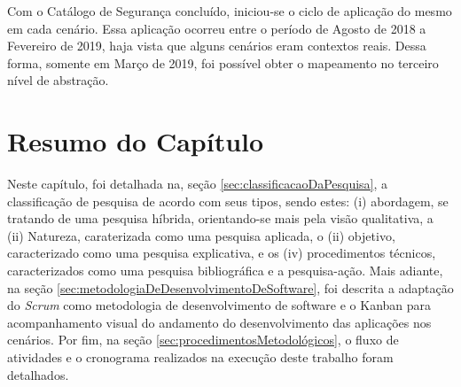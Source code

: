 Com o Catálogo de Segurança concluído, iniciou-se o ciclo de aplicação do mesmo em cada cenário. Essa aplicação ocorreu entre o período de Agosto de 2018 a Fevereiro de 2019, haja vista que alguns cenários eram contextos reais. Dessa forma, somente em Março de 2019, foi possível obter o mapeamento no terceiro nível de abstração.

\section*{Resumo do Capítulo}

Neste capítulo, foi detalhada na, seção \ref{sec:classificacaoDaPesquisa}, a classificação de pesquisa de acordo com seus tipos, sendo estes: (i) abordagem, se tratando de uma pesquisa híbrida, orientando-se mais pela visão qualitativa, a (ii) Natureza, caraterizada como uma pesquisa aplicada, o (ii) objetivo, caracterizado como uma pesquisa explicativa, e os (iv) procedimentos técnicos, caracterizados como uma pesquisa bibliográfica e a pesquisa-ação. Mais adiante, na seção \ref{sec:metodologiaDeDesenvolvimentoDeSoftware}, foi descrita a adaptação do \textit{Scrum} como metodologia de desenvolvimento de software e o Kanban para acompanhamento visual do andamento do desenvolvimento das aplicações nos cenários. Por fim, na seção \ref{sec:procedimentosMetodológicos}, o fluxo de atividades e o cronograma realizados na execução deste trabalho foram detalhados.

